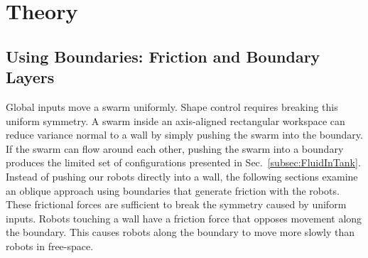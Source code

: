 \section{Theory}
\label{sec:theory}

\subsection{Using Boundaries: Friction and Boundary Layers}\label{subsec:WallFriction}
Global inputs move a swarm uniformly.  
Shape control requires breaking this uniform symmetry.  
A swarm inside an axis-aligned rectangular workspace can reduce variance normal to a wall by simply pushing the swarm into the boundary. 
If the swarm can flow around each other, pushing the swarm into a boundary produces the limited set of configurations presented in Sec.~\ref{subsec:FluidInTank}.
Instead of pushing our robots directly into a wall, the following sections examine an oblique approach  using boundaries that generate friction with the robots. 
 These frictional forces are  sufficient to break the symmetry caused by uniform inputs.  
Robots touching a wall have a friction force that opposes movement along the boundary.  
This causes robots along the boundary to move more slowly than robots in free-space. 
  

